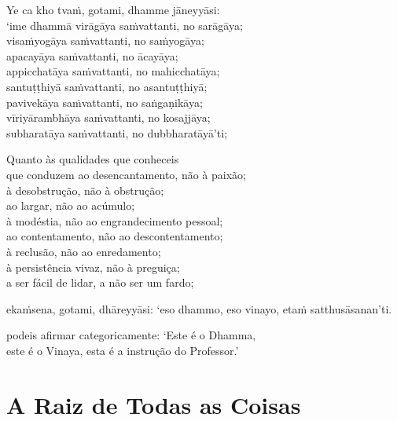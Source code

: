 Ye ca kho tvaṁ, gotami, dhamme jāneyyāsi:\\
‘ime dhammā virāgāya saṁvattanti, no sarāgāya;\\
visaṁyogāya saṁvattanti, no saṁyogāya;\\
apacayāya saṁvattanti, no ācayāya;\\
appicchatāya saṁvattanti, no mahicchatāya;\\
santuṭṭhiyā saṁvattanti, no asantuṭṭhiyā;\\
pavivekāya saṁvattanti, no saṅgaṇikāya;\\
vīriyārambhāya saṁvattanti, no kosajjāya;\\
subharatāya saṁvattanti, no dubbharatāyā’ti;

\begin{english}
  Quanto às qualidades que conheceis\\
  que conduzem ao desencantamento, não à paixão;\\
  à desobstrução, não à obstrução;\\
  ao largar, não ao acúmulo;\\
  à modéstia, não ao engrandecimento pessoal;\\
  ao contentamento, não ao descontentamento;\\
  à reclusão, não ao enredamento;\\
  à persistência vivaz, não à preguiça;\\
  a ser fácil de lidar, a não ser um fardo;
\end{english}

ekaṁsena, gotami, dhāreyyāsi: ‘eso dhammo, eso vinayo, etaṁ satthusāsanan’ti.

\begin{english}
  podeis afirmar categoricamente: ‘Este é o Dhamma,\\
  este é o Vinaya, esta é a instrução do Professor.’
\end{english}

\chapter{A Raiz de Todas as Coisas}



